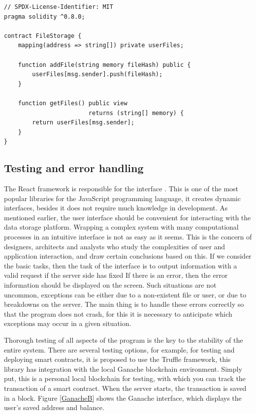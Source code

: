 \documentclass[10pt,conference,a4paper]{IEEEtran_EDM}
\begin{document}

\begin{lstlisting}[caption=Solidity code for a smart contract]
// SPDX-License-Identifier: MIT
pragma solidity ^0.8.0;

contract FileStorage {
    mapping(address => string[]) private userFiles;

    function addFile(string memory fileHash) public {
        userFiles[msg.sender].push(fileHash);
    }

    function getFiles() public view
                        returns (string[] memory) {
        return userFiles[msg.sender];
    }
}
\end{lstlisting}

\subsection{Testing and error handling}

The React framework is responsible for the interface \cite{Greg Lim}. This is one of the most popular libraries for the JavaScript programming language, it creates dynamic interfaces, besides it does not require much knowledge in development. As mentioned earlier, the user interface should be convenient for interacting with the data storage platform. Wrapping a complex system with many computational processes in an intuitive interface is not as easy as it seems. This is the concern of designers, architects and analysts who study the complexities of user and application interaction, and draw certain conclusions based on this. If we consider the basic tasks, then the task of the interface is to output
information with a valid request if the server side has fixed
If there is an error, then the error information should be displayed on the screen. Such situations are not uncommon, exceptions can be either due to a non-existent file or user, or due to breakdowns on the server. The main thing is to handle these errors correctly so that the program does not crash, for this it is necessary to anticipate which exceptions may occur in a given situation.

Thorough testing of all aspects of the program is the key to the stability of the entire system. There are several testing options, for example, for testing and deploying smart contracts, it is proposed to use the Truffle framework, this library has integration with the local Ganache blockchain environment. Simply put, this is a personal local blockchain for testing, with which you can track the transaction of a smart contract. When the server starts, the transaction is saved in a block. Figure \ref{GanacheB} shows the Ganache interface, which displays the user's saved address and balance.
\end{document}

